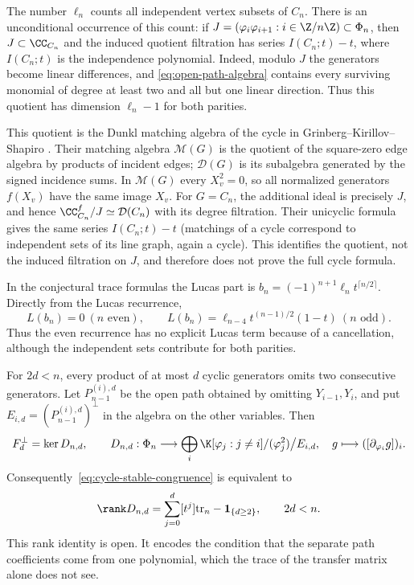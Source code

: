 \begin{remark}\label{rem:cycle-matching-quotient}
The number $\ell_n$ counts all independent vertex subsets of $C_n$.
There is an unconditional occurrence of this count: if
$J=(\varphi_i\varphi_{i+1}:i\in\Z/n\Z)\subset\Phi_n$, then
$J\subset\CC_{C_n}$ and the induced quotient filtration has series
$I(C_n;t)-t$, where $I(C_n;t)$ is the independence polynomial.
Indeed, modulo $J$ the generators become linear differences, and
\eqref{eq:open-path-algebra} contains every surviving monomial of degree
at least two and all but one linear direction. Thus this quotient has
dimension $\ell_n-1$ for both parities.

This quotient is the Dunkl matching algebra of the cycle in
Grinberg--Kirillov--Shapiro \cite{GKS}. Their matching algebra
$\mathcal M(G)$ is the quotient of the square-zero edge algebra by
products of incident edges; $\mathcal D(G)$ is its subalgebra generated
by the signed incidence sums. In $\mathcal M(G)$ every $X_v^2=0$, so
all normalized generators $f(X_v)$ have the same image $X_v$.
For $G=C_n$, the additional ideal is precisely $J$, and hence
$\CC_{C_n}^f/J\simeq\mathcal D(C_n)$ with its degree filtration.
Their unicyclic formula \cite[Theorem~5.16]{GKS} gives the same series
$I(C_n;t)-t$ (matchings of a cycle correspond to independent sets of
its line graph, again a cycle). This identifies the quotient, not the
induced filtration on $J$, and therefore does not prove the full
cycle formula.

In the conjectural trace formulas the Lucas part is
$b_n=(-1)^{n+1}\ell_nt^{\lceil n/2\rceil}$. Directly from the Lucas
recurrence,
\[
L(b_n)=0\ (n\text{ even}),\qquad
L(b_n)=\ell_{n-4}t^{(n-1)/2}(1-t)\ (n\text{ odd}).
\]
Thus the even recurrence has no explicit Lucas term because of a
cancellation, although the independent sets contribute for both
parities.
\end{remark}

\begin{remark}\label{rem:cycle-boundary-operator}
For $2d<n$, every product of at most $d$ cyclic generators omits two
consecutive generators. Let $P_{n-1}^{(i),d}$ be the open path obtained
by omitting $Y_{i-1},Y_i$, and put
$E_{i,d}=(P_{n-1}^{(i),d})^\perp$ in the algebra on the other variables.
Then
\[
F_d^\perp=\ker D_{n,d},\qquad
D_{n,d}:\Phi_n\longrightarrow
\bigoplus_i\K[\varphi_j:j\ne i]/(\varphi_j^2)\big/E_{i,d},
\quad g\longmapsto([\partial_{\varphi_i}g])_i.
\]
Consequently~\eqref{eq:cycle-stable-congruence} is equivalent to
\[
\rank D_{n,d}=\sum_{j=0}^d[t^j]\mathrm{tr}_n-\mathbf1_{\{d\ge2\}},
\qquad 2d<n.
\]
This rank identity is open. It encodes the condition that the
separate path coefficients come from one polynomial, which the trace of
the transfer matrix alone does not see.
\end{remark}


